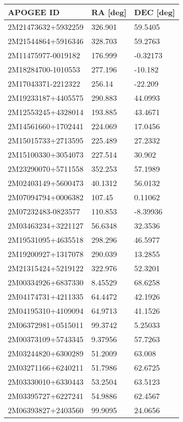 \documentclass[fleqn,usenatbib]{mnras}
\begin{document}
\begin{table}
\centering
  \begin{tabular}{lll}
  \toprule
  APOGEE ID  &       RA [deg] &       DEC [deg]                                     \\
  \midrule
2M21473632+5932259 &  326.901 &  59.5405 \\
2M21544864+5916346 &  328.703 &  59.2763 \\
2M11475977-0019182 &  176.999 & -0.32173 \\
2M18284700-1010553 &  277.196 &  -10.182 \\
2M17043371-2212322 &   256.14 &  -22.209 \\
2M19233187+4405575 &  290.883 &  44.0993 \\
2M12553245+4328014 &  193.885 &  43.4671 \\
2M14561660+1702441 &  224.069 &  17.0456 \\
2M15015733+2713595 &  225.489 &  27.2332 \\
2M15100330+3054073 &  227.514 &   30.902 \\
2M23290070+5711558 &  352.253 &  57.1989 \\
2M02403149+5600473 &  40.1312 &  56.0132 \\
2M07094794+0006382 &   107.45 &  0.11062 \\
2M07232483-0823577 &  110.853 & -8.39936 \\
2M03463234+3221127 &  56.6348 &  32.3536 \\
2M19531095+4635518 &  298.296 &  46.5977 \\
2M19200927+1317078 &  290.039 &  13.2855 \\
2M21315424+5219122 &  322.976 &  52.3201 \\
2M00334926+6837330 &  8.45529 &  68.6258 \\
2M04174731+4211335 &  64.4472 &  42.1926 \\
2M04195310+4109094 &  64.9713 &  41.1526 \\
2M06372981+0515011 &  99.3742 &  5.25033 \\
2M00373109+5743345 &  9.37956 &  57.7263 \\
2M03244820+6300289 &  51.2009 &   63.008 \\
2M03271166+6240211 &  51.7986 &  62.6725 \\
2M03330010+6330443 &  53.2504 &  63.5123 \\
2M03395727+6227241 &  54.9886 &  62.4567 \\
2M06393827+2403560 &  99.9095 &  24.0656 \\

\end{tabular}
\end{table}
\end{document}
